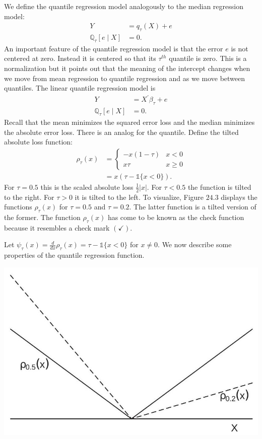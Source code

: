 \documentclass[10pt]{article}
\begin{document}
We define the quantile regression model analogously to the median regression model:
$$
\begin{aligned}
Y &=q_{\tau}(X)+e \\
\mathbb{Q}_{\tau}[e \mid X] &=0 .
\end{aligned}
$$
An important feature of the quantile regression model is that the error $e$ is not centered at zero. Instead it is centered so that its $\tau^{t h}$ quantile is zero. This is a normalization but it points out that the meaning of the intercept changes when we move from mean regression to quantile regression and as we move between quantiles. The linear quantile regression model is
$$
\begin{aligned}
Y &=X^{\prime} \beta_{\tau}+e \\
\mathbb{Q}_{\tau}[e \mid X] &=0 .
\end{aligned}
$$
Recall that the mean minimizes the squared error loss and the median minimizes the absolute error loss. There is an analog for the quantile. Define the tilted absolute loss function:
$$
\begin{aligned}
\rho_{\tau}(x) &=\left\{\begin{array}{cc}
-x(1-\tau) & x<0 \\
x \tau & x \geq 0
\end{array}\right.\\
&=x(\tau-\mathbb{1}\{x<0\}) .
\end{aligned}
$$
For $\tau=0.5$ this is the scaled absolute loss $\frac{1}{2}|x|$. For $\tau<0.5$ the function is tilted to the right. For $\tau>0$ it is tilted to the left. To visualize, Figure $24.3$ displays the functions $\rho_{\tau}(x)$ for $\tau=0.5$ and $\tau=0.2$. The latter function is a tilted version of the former. The function $\rho_{\tau}(x)$ has come to be known as the check function because it resembles a check mark $(\checkmark)$.

Let $\psi_{\tau}(x)=\frac{d}{d x} \rho_{\tau}(x)=\tau-\mathbb{1}\{x<0\}$ for $x \neq 0$. We now describe some properties of the quantile regression function.

\includegraphics[max width=\textwidth]{2022_10_23_47027c652ef567187a65g-07}
\end{document}

